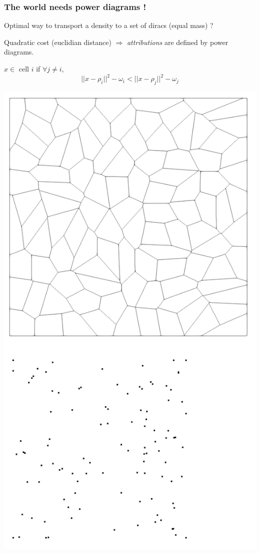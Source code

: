 \documentclass[aspectratio=169]{beamer}
\begin{document}
\begin{frame}
    \frametitle{The world needs power diagrams !}

    \begin{minipage}[c][0.6\textheight][c]{0.5\textwidth}
        Optimal way to transport a density to a set of diracs (equal mass) ? 
        
        \vfill
        Quadratic cost (euclidian distance) $\Rightarrow$ \textit{attributions} are 
            defined by power diagrams.
        
        \vfill
        $x \in$ cell $i$ if $\forall j \neq i$,
         $$|| x - \rho_i ||^2 - \omega_i < || x - \rho_j ||^2 - \omega_j $$
    \end{minipage}
    \kern 0.5cm
    \begin{minipage}{0.45\textwidth}
        \begin{center}
            \includegraphics[height=0.8\textheight]{img/pd.png}
        \end{center}
    \end{minipage}
\end{frame}
\end{document}
